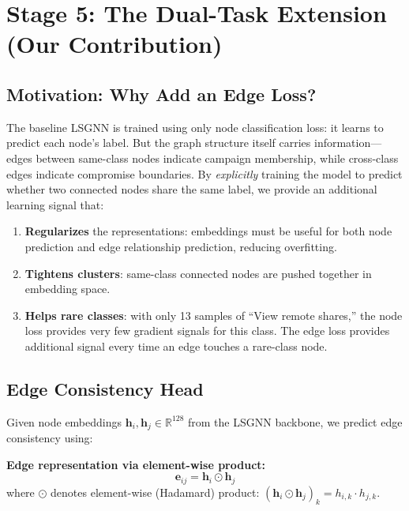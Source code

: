 \documentclass[conference]{IEEEtran}
\newcommand{\R}{\mathbb{R}}
\newcommand{\vect}[1]{\bm{#1}}
\begin{document}
\section{Stage 5: The Dual-Task Extension (Our Contribution)}
\label{sec:dual}

\subsection{Motivation: Why Add an Edge Loss?}

The baseline LSGNN is trained using only node classification loss: it learns to predict each node's label. But the graph structure itself carries information---edges between same-class nodes indicate campaign membership, while cross-class edges indicate compromise boundaries. By \emph{explicitly} training the model to predict whether two connected nodes share the same label, we provide an additional learning signal that:

\begin{enumerate}
    \item \textbf{Regularizes} the representations: embeddings must be useful for both node prediction and edge relationship prediction, reducing overfitting.
    \item \textbf{Tightens clusters}: same-class connected nodes are pushed together in embedding space.
    \item \textbf{Helps rare classes}: with only 13 samples of ``View remote shares,'' the node loss provides very few gradient signals for this class. The edge loss provides additional signal every time an edge touches a rare-class node.
\end{enumerate}

\subsection{Edge Consistency Head}

Given node embeddings $\vect{h}_i, \vect{h}_j \in \R^{128}$ from the LSGNN backbone, we predict edge consistency using:

\textbf{Edge representation via element-wise product:}
\begin{equation}
    \vect{e}_{ij} = \vect{h}_i \odot \vect{h}_j
\end{equation}
where $\odot$ denotes element-wise (Hadamard) product: $(\vect{h}_i \odot \vect{h}_j)_k = h_{i,k} \cdot h_{j,k}$.
\end{document}
